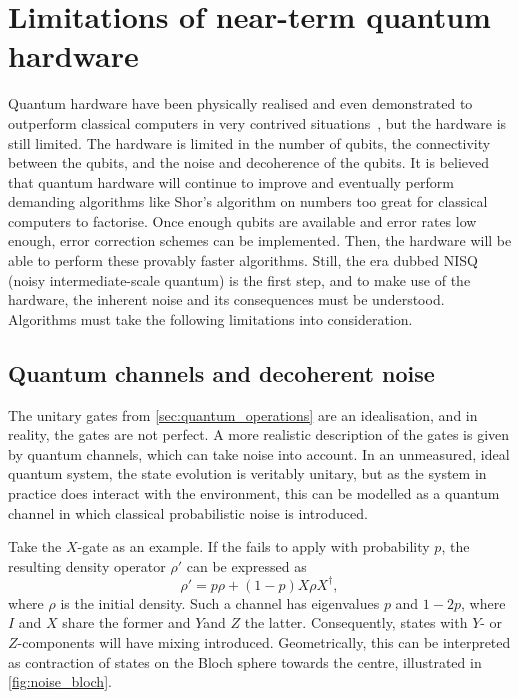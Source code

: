 \section{Limitations of near-term quantum hardware}
\label{sec:nisq}
Quantum hardware have been physically realised and even demonstrated to outperform classical computers in very contrived situations~\autocite{arute2019, zhong2020, madsen2022}, but the hardware is still limited.
The hardware is limited in the number of qubits, the connectivity between the qubits, and the noise and decoherence of the qubits.
It is believed that quantum hardware will continue to improve and eventually perform demanding algorithms like Shor's algorithm on numbers too great for classical computers to factorise.
Once enough qubits are available and error rates low enough, error correction schemes can be implemented.
Then, the hardware will be able to perform these provably faster algorithms.
Still, the era dubbed NISQ (noisy intermediate-scale quantum) is the first step, and to make use of the hardware, the inherent noise and its consequences must be understood.
Algorithms must take the following limitations into consideration.

\subsection{Quantum channels and decoherent noise}
The unitary gates from \cref{sec:quantum_operations} are an idealisation, and in reality, the gates are not perfect.
A more realistic description of the gates is given by quantum channels, which can take noise into account.
In an unmeasured, ideal quantum system, the state evolution is veritably unitary, but as the system in practice does interact with the environment, this can be modelled as a quantum channel in which classical probabilistic noise is introduced.

Take the $X$-gate as an example.
If the fails to apply with probability $p$, the resulting density operator $\rho'$ can be expressed as
\begin{equation}
  \rho' = p\rho + (1-p)X\rho X^\dagger,
\end{equation}
where $\rho$ is the initial density.
Such a channel has eigenvalues $p$ and $1-2p$, where $I$ and $X$ share the former and $Y$and $Z$ the latter.
Consequently, states with $Y$- or $Z$-components will have mixing introduced.
Geometrically, this can be interpreted as contraction of states on the Bloch sphere towards the centre, illustrated in \cref{fig:noise_bloch}.

